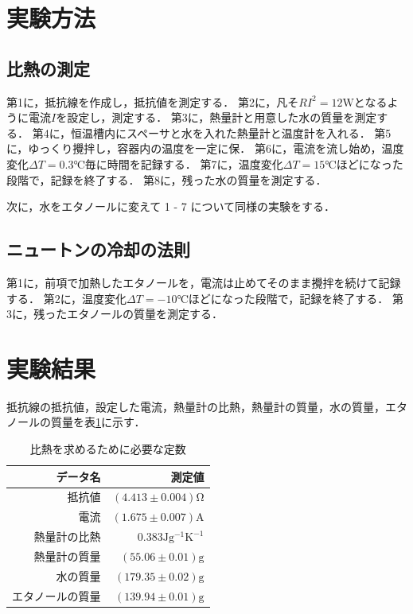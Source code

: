 \documentclass[uplatex,dvipdfmx,a4paper,10pt]{jsarticle}
\begin{document}
\section{実験方法}
\subsection{比熱の測定}
第1に，抵抗線を作成し，抵抗値を測定する．
第2に，凡そ$RI^2 = 12\mathrm{W} $となるように電流$I$を設定し，測定する．
第3に，熱量計と用意した水の質量を測定する．
第4に，恒温槽内にスペーサと水を入れた熱量計と温度計を入れる．
第5に，ゆっくり攪拌し，容器内の温度を一定に保．
第6に，電流を流し始め，温度変化$\Delta T = 0.3℃$毎に時間を記録する．
第7に，温度変化$\Delta T = 15℃$ほどになった段階で，記録を終了する．
第8に，残った水の質量を測定する．

次に，水をエタノールに変えて 1 - 7 について同様の実験をする．

\subsection{ニュートンの冷却の法則}
第1に，前項で加熱したエタノールを，電流は止めてそのまま攪拌を続けて記録する．
第2に，温度変化$\Delta T = -10℃$ほどになった段階で，記録を終了する．
第3に，残ったエタノールの質量を測定する．

\section{実験結果}
抵抗線の抵抗値，設定した電流，熱量計の比熱，熱量計の質量，水の質量，エタノールの質量を表\ref{tb:const}に示す．

\begin{table}[htbp]
    \begin{center}
        \caption{比熱を求めるために必要な定数}%
        \label{tb:const}
        \begin{tabular}{r|r}
            \hline
            データ名 & 測定値\\
            \hline
            抵抗値 & $(4.413 \pm 0.004)\mathrm{Ω}$\\
            電流 & $(1.675 \pm 0.007)\mathrm{A}$\\
            熱量計の比熱 & $0.383 \mathrm{Jg^{-1}K^{-1}}$\\ %
            熱量計の質量 & $(55.06\pm 0.01) \mathrm{g}$\\
            水の質量 & $(179.35 \pm 0.02) \mathrm{g}$\\
            エタノールの質量 & $(139.94 \pm 0.01)\mathrm{g}$\\
            \hline
        \end{tabular}
    \end{center}
\end{table}
\end{document}
